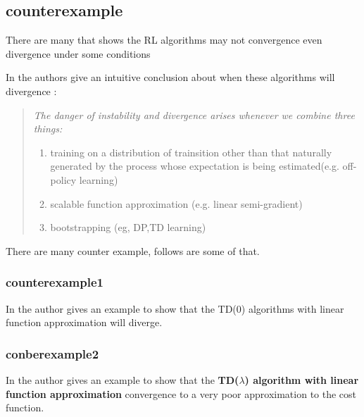 \documentclass[10pt,a4paper]{article}
\theoremstyle{definition}
\theoremstyle{remark}
\newcommand{\lamb}{$\lambda$}
\begin{document}
	\subsection{counterexample}	
	
	There are many  that shows the RL algorithms may not convergence even divergence under some conditions
	
	
	 In \citep[chap 11.3]{sutton2011reinforcement} the authors give  an intuitive conclusion about when these algorithms will divergence :
	 
	\begin{quotation}
		\em
		The danger of instability and divergence arises whenever we combine  three things:
		\begin{enumerate}
			\item training on a distribution of trainsition other than that naturally generated by the process whose expectation is being estimated(e.g. off-policy learning)
			\item scalable function approximation (e.g. linear semi-gradient)
			\item bootstrapping (eg, DP,TD learning)
		\end{enumerate}
	\end{quotation}
	
	There are many counter example, follows are some of that.
	
	\subsubsection{counterexample1}
	In \citep{Baird}  the author gives an example to show that the TD(0) algorithms with linear function approximation will diverge.

	\subsubsection{conberexample2}
	In \citep{bertsekas1995counterexample} the author gives an example to show that the \textbf{TD(\lamb) algorithm with linear function approximation }  convergence to a very poor approximation to the cost function.
	
\end{document}
